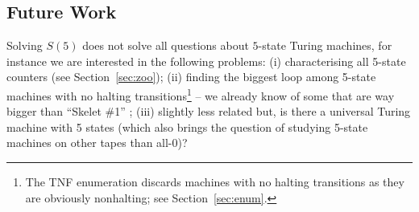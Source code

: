 \documentclass[a4paper,british]{article}
\theoremstyle{definition} %
\numberwithin{equation}{section}
\theoremstyle{definition} %
\newcommand{\tsm}[1]{\todo{TS: #1}}
\newcommand{\CoqBB}{Coq-BB5\xspace}
\begin{document}
























% 

\subsection{Future Work}\label{sec:fw}

Solving $S(5)$ does not solve all questions about $5$-state Turing machines, for instance we are interested in the following problems: (i) characterising all 5-state counters (see Section~\ref{sec:zoo}); (ii) finding the biggest loop among 5-state machines with no halting transitions\footnote{The TNF enumeration discards machines with no halting transitions as they are obviously nonhalting; see Section~\ref{sec:enum}.} -- we already know of some that are way bigger than ``Skelet \#1'' \cite{ligocki2022motherofgiants}; (iii) slightly less related but, is there a universal Turing machine with 5 states (which also brings the question of studying 5-state machines on other tapes than all-0)?
\end{document}
